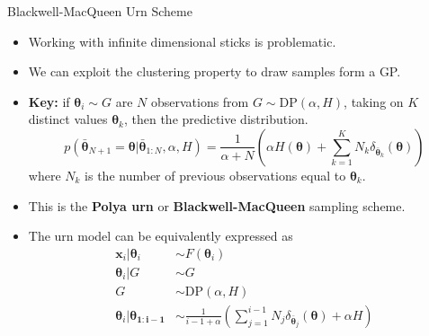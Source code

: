 \documentclass[10pt,mathserif]{beamer}
\begin{document}
\begin{frame}{Blackwell-MacQueen Urn Scheme}
\begin{itemize}
    \item Working with infinite dimensional sticks is problematic.
    \item We can exploit the clustering property to draw samples form a GP.
    \item \textbf{Key:} if $\bm{\theta}_i \sim G$ are $N$ observations from $G \sim \text{DP}(\alpha,H)$, taking on $K$ distinct values $\bm{\theta}_k$, then the predictive distribution.
    \begin{equation*}
        p(\bar{\bm{\theta}}_{N+1} =\bm{\theta}|\bar{\bm{\theta}}_{1:N},\alpha,H)= \frac{1}{\alpha+N} (\alpha H(\bm{\theta})+ \sum_{k=1}^K N_k\delta_{\bar{\bm{\theta}}_k}(\bm{\theta}) )
    \end{equation*}
    where $N_k$ is the number of previous observations equal to $\bm{\theta}_k$. 
    \item This is the \textbf{Polya urn} or \textbf{Blackwell-MacQueen} sampling scheme.
    \item The urn model can be equivalently expressed as
        \begin{equation*}
            \begin{split}
            \bm{x}_i|\bm{\theta}_i & \sim F(\bm{\theta}_i)\\
            \bm{\theta}_i|G   & \sim  G \\
            G  & \sim \text{DP}(\alpha, H)\\
            \bm{\theta}_i|\bm{\theta_{1:i-1}}  & \sim  \frac{1}{i-1+\alpha}(\sum_{j=1}^{i-1}N_j\delta_{\bar{\bm{\theta}}_j}(\bm{\theta}) + \alpha H)
            \end{split}
        \end{equation*}
\end{itemize}    
\end{frame}
        
\end{document}

